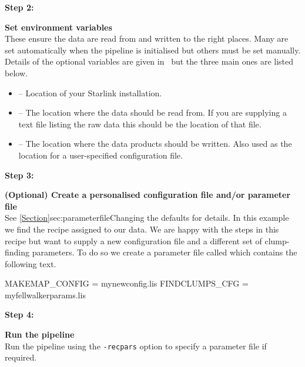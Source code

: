 \documentclass[11pt,oneside,chapters]{starlink}
\begin{document}
\begin{minipage}[t]{0.12\linewidth}
\textbf{Step 2:}
\end{minipage}
\begin{minipage}[t]{0.87\linewidth}
\textbf{Set environment variables} \\These ensure the data are read
from and written to the right places. Many are set automatically when
the pipeline is initialised but others must be set manually. Details
of the optional variables are given in \pipelinesun\ but the three
main ones are listed below.
\begin{itemize}\itemsep-0.1em
\item {} -- Location of your Starlink installation.
\item {} -- The location where the data should be read from.
If you are supplying a text file listing the raw data this should be the
location of that file.
\item {} -- The location where the data products should be
written. Also used as the location for a user-specified configuration file.\\
\end{itemize}
\end{minipage}

\begin{minipage}[t]{0.12\linewidth}
\textbf{Step 3:}
\end{minipage}
\begin{minipage}[t]{0.87\linewidth}
\textbf{(Optional) Create a personalised configuration file and/or parameter file} \\
See \cref{Section}{sec:parameterfile}{Changing the defaults} for
details. In this example we find the recipe 
assigned to our data. We are happy with the steps in this recipe but
want to supply a new configuration file and a different set of
clump-finding parameters. To do so we create a parameter file called
 which contains the following text.

\begin{terminalv}
MAKEMAP_CONFIG = mynewconfig.lis
FINDCLUMPS_CFG = myfellwalkerparams.lis

\end{terminalv}

\end{minipage}


\begin{minipage}[t]{0.12\linewidth}
\textbf{Step 4:}
\end{minipage}
\begin{minipage}[t]{0.87\linewidth}
\textbf{Run the pipeline} \\Run the pipeline using the
\texttt{-recpars} option to specify a parameter file if required.
\begin{terminalv}
\end{terminalv}
\end{minipage}
\end{document}
